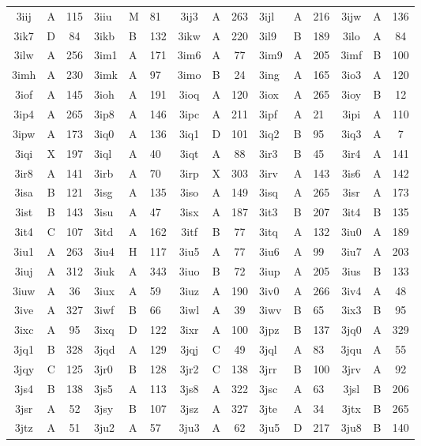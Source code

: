 \begin{longtable}{|c|c|c| a|a|a| c|c|c| a|a|a| c|c|c|}
3iij & A & 115 & 3iiu & M & 81 & 3ij3 & A & 263 & 3ijl & A & 216 & 3ijw & A & 136\\
3ik7 & D & 84 & 3ikb & B & 132 & 3ikw & A & 220 & 3il9 & B & 189 & 3ilo & A & 84\\
3ilw & A & 256 & 3im1 & A & 171 & 3im6 & A & 77 & 3im9 & A & 205 & 3imf & B & 100\\
3imh & A & 230 & 3imk & A & 97 & 3imo & B & 24 & 3ing & A & 165 & 3io3 & A & 120\\
3iof & A & 145 & 3ioh & A & 191 & 3ioq & A & 120 & 3iox & A & 265 & 3ioy & B & 12\\
3ip4 & A & 265 & 3ip8 & A & 146 & 3ipc & A & 211 & 3ipf & A & 21 & 3ipi & A & 110\\
3ipw & A & 173 & 3iq0 & A & 136 & 3iq1 & D & 101 & 3iq2 & B & 95 & 3iq3 & A & 7\\
3iqi & X & 197 & 3iql & A & 40 & 3iqt & A & 88 & 3ir3 & B & 45 & 3ir4 & A & 141\\
3ir8 & A & 141 & 3irb & A & 70 & 3irp & X & 303 & 3irv & A & 143 & 3is6 & A & 142\\
3isa & B & 121 & 3isg & A & 135 & 3iso & A & 149 & 3isq & A & 265 & 3isr & A & 173\\
3ist & B & 143 & 3isu & A & 47 & 3isx & A & 187 & 3it3 & B & 207 & 3it4 & B & 135\\
3it4 & C & 107 & 3itd & A & 162 & 3itf & B & 77 & 3itq & A & 132 & 3iu0 & A & 189\\
3iu1 & A & 263 & 3iu4 & H & 117 & 3iu5 & A & 77 & 3iu6 & A & 99 & 3iu7 & A & 203\\
3iuj & A & 312 & 3iuk & A & 343 & 3iuo & B & 72 & 3iup & A & 205 & 3ius & B & 133\\
3iuw & A & 36 & 3iux & A & 59 & 3iuz & A & 190 & 3iv0 & A & 266 & 3iv4 & A & 48\\
3ive & A & 327 & 3iwf & B & 66 & 3iwl & A & 39 & 3iwv & B & 65 & 3ix3 & B & 95\\
3ixc & A & 95 & 3ixq & D & 122 & 3ixr & A & 100 & 3jpz & B & 137 & 3jq0 & A & 329\\
3jq1 & B & 328 & 3jqd & A & 129 & 3jqj & C & 49 & 3jql & A & 83 & 3jqu & A & 55\\
3jqy & C & 125 & 3jr0 & B & 128 & 3jr2 & C & 138 & 3jrr & B & 100 & 3jrv & A & 92\\
3js4 & B & 138 & 3js5 & A & 113 & 3js8 & A & 322 & 3jsc & A & 63 & 3jsl & B & 206\\
3jsr & A & 52 & 3jsy & B & 107 & 3jsz & A & 327 & 3jte & A & 34 & 3jtx & B & 265\\
3jtz & A & 51 & 3ju2 & A & 57 & 3ju3 & A & 62 & 3ju5 & D & 217 & 3ju8 & B & 140\\

\end{longtable}
